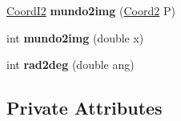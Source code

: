 \begin{DoxyCompactItemize}
\item 
\hyperlink{classCoordI2}{Coord\+I2} {\bfseries mundo2img} (\hyperlink{structCoord2}{Coord2} P)\hypertarget{classAnimacao_aeba3163e732959afe2bb665bb73b2dc5}{}\label{classAnimacao_aeba3163e732959afe2bb665bb73b2dc5}

\item 
int {\bfseries mundo2img} (double x)\hypertarget{classAnimacao_a507a681ae5c24c74b8d5de4f33aae9a2}{}\label{classAnimacao_a507a681ae5c24c74b8d5de4f33aae9a2}

\item 
int {\bfseries rad2deg} (double ang)\hypertarget{classAnimacao_a61bb9da4858791ba3cc153a9584f5375}{}\label{classAnimacao_a61bb9da4858791ba3cc153a9584f5375}

\end{DoxyCompactItemize}
\subsection*{Private Attributes}
